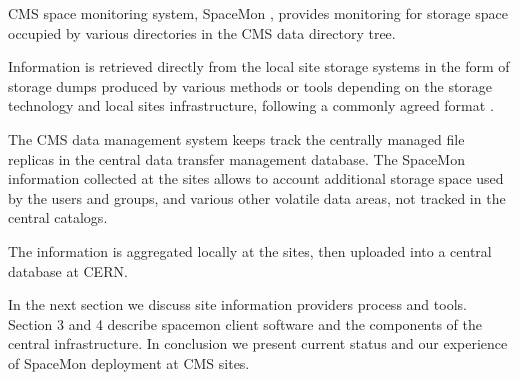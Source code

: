 CMS space monitoring system, SpaceMon \cite{spacemon}, provides monitoring for storage space 
occupied by various directories in the CMS data directory tree. 

Information is retrieved directly from the local site storage systems in the form of 
storage dumps produced by various methods or tools depending on the storage technology and
local sites infrastructure, following a commonly agreed format \cite{storagedumps}.

The CMS data management system \cite{cmsdatamanagement} keeps track the centrally managed 
file replicas in the central data transfer management database. The SpaceMon information 
collected at the sites allows to account additional storage space used by the users 
and groups, and various other volatile data areas, not tracked in the central catalogs.

The information is aggregated locally at the sites, then uploaded into a central database at CERN.

In the next section we discuss site information providers process and tools.
Section 3 and 4 describe spacemon client software and the components of the central infrastructure.
In conclusion we present current status and our experience of SpaceMon deployment at CMS sites.
